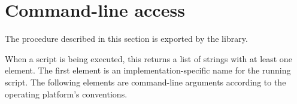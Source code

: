 \section{Command-line access}
\label{scriptlibsection}

The procedure described in this section is exported by the
 library.

\begin{entry}{%
}

When a script is being executed, this returns a list of strings with
at least one element.  The first element is an implementation-specific
name for the running script.  The following elements are command-line
arguments according to the operating platform's conventions.
\end{entry}

